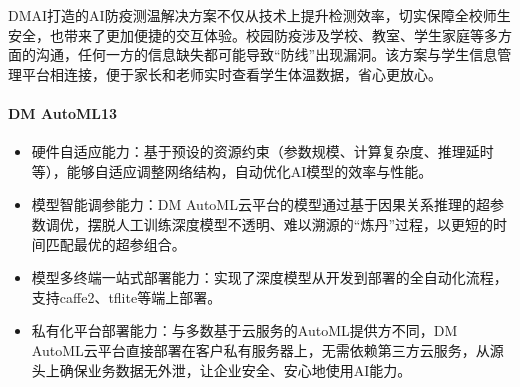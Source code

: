 \documentclass[letterpaper,11pt,english]{sphinxmanual}
\begin{document}
DMAI打造的AI防疫测温解决方案不仅从技术上提升检测效率，切实保障全校师生安全，也带来了更加便捷的交互体验。校园防疫涉及学校、教室、学生家庭等多方面的沟通，任何一方的信息缺失都可能导致“防线”出现漏洞。该方案与学生信息管理平台相连接，便于家长和老师实时查看学生体温数据，省心更放心。%
\begin{footnote}[895]\sphinxAtStartFootnote
{}
%
\end{footnote}


\paragraph{DM AutoML13\sphinxfootnotemark[896]}
\label{\detokenize{chapter_company/dm-ai:dm-automl13}}%
\begin{footnotetext}[896]\sphinxAtStartFootnote
{}
%
\end{footnotetext}\ignorespaces \begin{itemize}
\item {} 
硬件自适应能力：基于预设的资源约束（参数规模、计算复杂度、推理延时等），能够自适应调整网络结构，自动优化AI模型的效率与性能。

\item {} 
模型智能调参能力：DM
AutoML云平台的模型通过基于因果关系推理的超参数调优，摆脱人工训练深度模型不透明、难以溯源的“炼丹”过程，以更短的时间匹配最优的超参组合。

\item {} 
模型多终端一站式部署能力：实现了深度模型从开发到部署的全自动化流程，支持caffe2、tf\sphinxhyphen{}lite等端上部署。

\item {} 
私有化平台部署能力：与多数基于云服务的AutoML提供方不同，DM
AutoML云平台直接部署在客户私有服务器上，无需依赖第三方云服务，从源头上确保业务数据无外泄，让企业安全、安心地使用AI能力。

\end{itemize}
\end{document}
